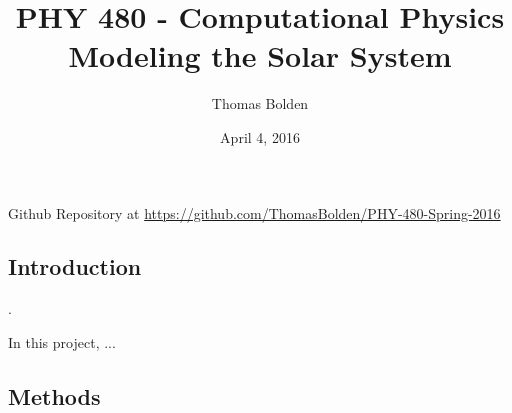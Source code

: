 \documentclass[11pt]{article}
\title{PHY 480 - Computational Physics \\ Modeling the Solar System}
\author{Thomas Bolden}
\date{April 4, 2016}
\begin{document}
\maketitle

\thispagestyle{empty}

\centerline{Github Repository at \href{https://github.com/ThomasBolden/PHY-480-Spring-2016}{https://github.com/ThomasBolden/PHY-480-Spring-2016}}

\begin{abstract}

    \lipsum[1-1]

\end{abstract}

\vfill

\tableofcontents

\vspace{3cm}

\pagebreak

\subsection{Introduction}

    . 

    In this project, ...

\subsection{Methods}


\end{document}
